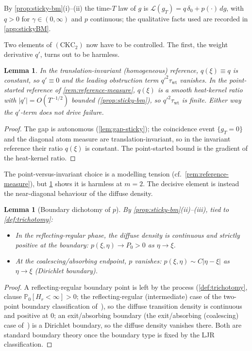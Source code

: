 \documentclass[reqno,final,11pt]{amsart}
\theoremstyle{plain}
\newtheorem{lemma}[theorem]{Lemma}
\theoremstyle{definition}
\theoremstyle{remark}
\newcommand{\Prob}{\mathbb P}
\newcommand{\CKC}{(\mathrm{CKC}_{2})}
\begin{document}
By \cref{prop:sticky-bm}(i)--(ii) the time-$T$ law of $g$ is
$\mathcal L(g_T)=q\,\delta_0+p(\cdot)\,dg$, with $q>0$ for $\gamma\in(0,\infty)$
and $p$ continuous; the qualitative facts used are recorded in
\cref{app:stickyBM}.

Two elements of $\CKC$ now have to be controlled. The first, the weight
derivative $q'$, turns out to be harmless.

\begin{lemma}\label{lem:checkA}
In the translation-invariant (homogeneous) reference, $q(\xi)\equiv q$ is
constant, so $q'\equiv0$ and the leading obstruction term
$q'^2\tau_{\mathrm{wt}}$ vanishes. In the point-started reference of
\cref{rem:reference-measure}, $q(\xi)$ is a smooth heat-kernel ratio with
$|q'|=O(T^{-1/2})$ bounded (\cref{prop:sticky-bm}), so $q'^2\tau_{\mathrm{wt}}$
is finite. Either way the $q'$-term does not drive failure.
\end{lemma}
\begin{proof}
The gap is autonomous (\cref{lem:gap-sticky}); the coincidence event
$\{g_T=0\}$ and the diagonal atom measure are translation-invariant, so in
the invariant reference their ratio $q(\xi)$ is constant. The point-started
bound is the gradient of the heat-kernel ratio.
\end{proof}

The point-versus-invariant choice is a modelling tension
(cf.~\cref{rem:reference-measure}), but \cref{lem:checkA} shows it is harmless at
$m=2$. The decisive element is instead the near-diagonal behaviour of the
diffuse density.

\begin{lemma}[Boundary dichotomy of $p$]\label{lem:checkB}
By \cref{prop:sticky-bm}(ii)--(iii), tied to \cref{def:trichotomy}:
\begin{itemize}
\item[\textnormal{(R)}] In the reflecting-regular phase, the diffuse density
is continuous and strictly positive at the boundary:
$p(\xi,\eta)\to P_0>0$ as $\eta\to\xi$.
\item[\textnormal{(C)}] At the coalescing/absorbing endpoint, $p$ vanishes:
$p(\xi,\eta)\sim C|\eta-\xi|$ as $\eta\to\xi$ (Dirichlet boundary).
\end{itemize}
\end{lemma}
\begin{proof}
A reflecting-regular boundary point is left by the process
(\cref{def:trichotomy}, clause $\Prob_0[H_r<\infty]>0$; the reflecting-regular
(intermediate) case of the two-point boundary classification of~\citep{LJR-FCN}),
so the diffuse transition density is continuous and positive at $0$; an
exit/absorbing boundary (the exit/absorbing (coalescing) case
of~\citep{LJR-FCN}) is a Dirichlet boundary, so the diffuse density vanishes
there. Both are standard boundary theory once the boundary type is fixed by the
LJR classification.
\end{proof}
\end{document}
